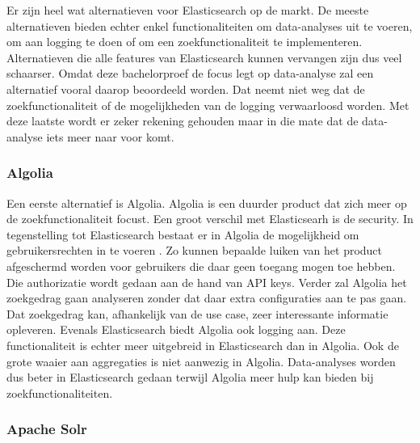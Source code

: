 Er zijn heel wat alternatieven voor Elasticsearch op de markt. De meeste alternatieven bieden echter enkel functionaliteiten om data-analyses uit te voeren, om aan logging te doen of om een zoekfunctionaliteit te implementeren. Alternatieven die alle features van Elasticsearch kunnen vervangen zijn dus veel schaarser. Omdat deze bachelorproef de focus legt op data-analyse zal een alternatief vooral daarop beoordeeld worden. Dat neemt niet weg dat de zoekfunctionaliteit of de mogelijkheden van de logging verwaarloosd worden. Met deze laatste wordt er zeker rekening gehouden maar in die mate dat de data-analyse iets meer naar voor komt.

\subsubsection{Algolia}

Een eerste alternatief is Algolia. Algolia is een duurder product dat zich meer op de zoekfunctionaliteit focust. Een groot verschil met Elasticsearh is de security. In tegenstelling tot Elasticsearch bestaat er in Algolia de mogelijkheid om gebruikersrechten in te voeren \autocite{Algolia}. Zo kunnen bepaalde luiken van het product afgeschermd worden voor gebruikers die daar geen toegang mogen toe hebben. Die authorizatie wordt gedaan aan de hand van API keys. Verder zal Algolia het zoekgedrag gaan analyseren zonder dat daar extra configuraties aan te pas gaan. Dat zoekgedrag kan, afhankelijk van de use case, zeer interessante informatie opleveren. Evenals Elasticsearch biedt Algolia ook logging aan. Deze functionaliteit is echter meer uitgebreid in Elasticsearch dan in Algolia. Ook de grote waaier aan aggregaties is niet aanwezig in Algolia. Data-analyses worden dus beter in Elasticsearch gedaan terwijl Algolia meer hulp kan bieden bij zoekfunctionaliteiten.

\subsubsection{Apache Solr}


